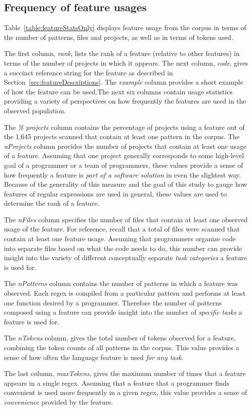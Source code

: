 \subsection{Frequency of feature usages}


\label{sec:featureResults}
Table~\ref{table:featureStatsOnly} displays feature usage from the corpus in terms of the number of patterns, files and projects, as well as in terms of tokens used.

The first column, \emph{rank}, lists the rank of a feature (relative to other features) in terms of the number of projects in which it appears. The next column, \emph{code}, gives a succinct reference string for the feature as described in Section~\ref{sec:featureDescriptions}. The \emph{example} column provides a short example of how the feature can be used.The next six columns contain usage statistics providing a variety of perspectives on how frequently the features are used in the observed population.

The \emph{\% projects} column contains the percentage of projects  using a feature out of the 1,645 projects scanned that contain at least one pattern in the corpus.  The \emph{nProjects} column provides the number of projects that contain at least one usage of a feature.  Assuming that one project generally corresponds to some high-level goal of a programmer or a team of programmers, these values provide a sense of how frequently a feature is \emph{part of a software solution} in even the slightest way.  Because of the generality of this measure and the goal of this study to gauge how features of regular expressions are used in general, these values are used to determine the rank of a feature.

The \emph{nFiles} column specifies the number of files that contain at least one observed usage of the feature.  For reference, recall that a total of  files were scanned that contain at least one feature usage.  Assuming that programmers organize code into separate files based on what the code needs to do, this number can provide insight into the variety of different conceptually separate \emph{task categories} a feature is used for.

The \emph{nPatterns} column contains the number of patterns in which a feature was observed. Each regex is compiled from a particular pattern and performs at least one function desired by a programmer.  Therefore the number of patterns composed using a feature can provide insight into the number of \emph{specific tasks} a feature is used for.

The \emph{nTokens} column, gives the total number of tokens observed for a feature, combining the token counts of all patterns in the corpus.  This value provides a sense of how often the language feature is used \emph{for any task}.

The last column, \emph{maxTokens}, gives the maximum number of times that a feature appears in a single regex.  Assuming that a feature that a programmer finds convenient is used more frequently in a given regex, this value provides a sense of \emph{convenience} provided by the feature.
